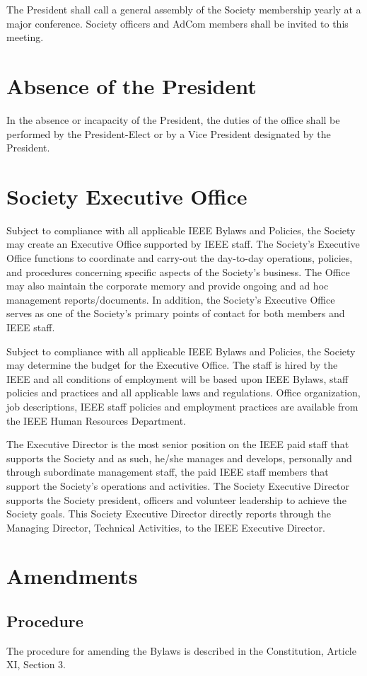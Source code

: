 \documentclass[10pt]{article}
\begin{document}
The President shall call a general assembly of the Society membership yearly at a major conference.  Society officers and AdCom members shall be invited to this meeting.


\section{Absence of the President}

In the absence or incapacity of the President, the duties of the office shall be performed by the President-Elect or by a Vice President designated by the President.

\section{Society Executive Office}

Subject to compliance with all applicable IEEE Bylaws and Policies, the Society may create an Executive Office supported by IEEE staff.  The Society’s Executive Office functions to coordinate and carry-out the day-to-day operations, policies, and procedures concerning specific aspects of the Society’s business.  The Office may also maintain the corporate memory and provide ongoing and ad hoc management reports/documents.  In addition, the Society’s Executive Office serves as one of the Society’s primary points of contact for both members and IEEE staff. 

Subject to compliance with all applicable IEEE Bylaws and Policies, the Society may determine the budget for the Executive Office.  The staff is hired by the IEEE and all conditions of employment will be based upon IEEE Bylaws, staff policies and practices and all applicable laws and regulations.  Office organization, job descriptions, IEEE staff policies and employment practices are available from the IEEE Human Resources Department.  

The Executive Director is the most senior position on the IEEE paid staff that supports the Society and as such, he/she manages and develops, personally and through subordinate management staff, the paid IEEE staff members that support the Society’s operations and activities.  The Society Executive Director supports the Society president, officers and volunteer leadership to achieve the Society goals. This Society Executive Director directly reports through the Managing Director, Technical Activities, to the IEEE Executive Director.


\section{Amendments}

\subsection{Procedure}

The procedure for amending the Bylaws is described in the Constitution, Article XI, Section 3. 
\end{document}
